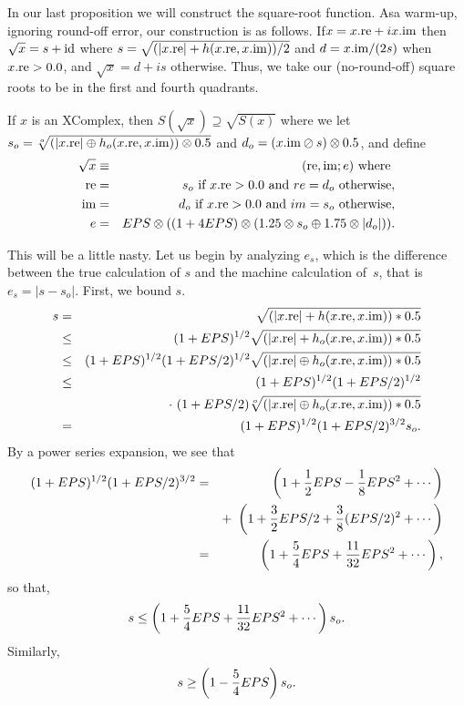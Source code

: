 In our last proposition we will construct the square-root function.  As\break a warm-up, ignoring round-off error, our
construction is as follows.  If\break $x = x.{\rm re} + i x.{\rm im}$ then $\sqrt{x} = s + {\rm i d}$ where $s=\sqrt{(|x.{\rm
re}| + h(x.{\rm re},x.{\rm im}))/2}$ and $d = x.{\rm im}/(2s)$ when $x.{\rm re} > 0.0$, and $\sqrt{x} = d + i s$ otherwise.  
Thus, we take our (no-round-off) square roots to be in the first and fourth quadrants.

If $x$ is an {\rm XComplex,} then $S(\sqrt{x}) \supseteq \sqrt{S(x)}$
where we
let $s_o = \root o \of {(|x.{\rm re}| \oplus h_o (x.{\rm re},x.{\rm im})) \otimes 0.5}$
 and $d_o = (x.{\rm im} \oslash s) \otimes 0.5${\rm ,} and define
\begin{eqnarray*}
 \sqrt{x} & \equiv &({\rm re},{\rm im};e) \hbox{ where }\\
 {\rm re} &=& s_o \hbox{ if $x.{\rm re} > 0.0$ and $re = d_o$ otherwise},\\
{\rm im}& =& d_o \hbox{ if $x.{\rm re} > 0.0$ and $im = s_o$ otherwise},
\\
e& =& EPS \otimes ((1 + 4 EPS) \otimes (1.25 \otimes s_o \oplus 1.75 \otimes |d_o|)).
\end{eqnarray*}
\endproclaim

This will be a little nasty.  Let us begin by analyzing $e_s$, which is the difference between the true calculation of $s$ and
the machine calculation of~$s$, that is $e_s = |s - s_o|.$   First, we bound $s.$
\begin{eqnarray*}
s &=& \sqrt{(|x.{\rm re}| + h(x.{\rm re},x.{\rm im})) * 0.5}\\
&\le& (1+EPS)^{1/2} \sqrt{(|x.{\rm re}| + h_o(x.{\rm re},x.{\rm im}))
* 0.5}\\
&\le& (1+EPS)^{1/2} (1+EPS/2)^{1/2}
\sqrt{(|x.{\rm re}| \oplus h_o(x.{\rm re},x.{\rm im})) * 0.5}\\
&\le& (1+EPS)^{1/2} (1+EPS/2)^{1/2}\\
&&\cdot\ (1+EPS/2)
\root o \of {(|x.{\rm re}| \oplus h_o(x.{\rm re},x.{\rm im})) * 0.5}\\
&=& (1+EPS)^{1/2} (1+EPS/2)^{3/2} s_o.
\end{eqnarray*}
By a power series expansion, we see that
\begin{eqnarray*}
(1+EPS)^{1/2} (1+EPS/2)^{3/2}&=&\left(1 + {1 \over 2} EPS - {1 \over 8} EPS^2 + \cdots\right)\\
&& +\
     \left(1 + {3 \over 2} EPS/2 + {3 \over 8} (EPS/2)^2 +\cdots\right)\\
&=&\left(1 + {5 \over 4} EPS + {11 \over 32} EPS^2 +\cdots\right),
\end{eqnarray*}
so that,
$$s \le \left(1 + {5 \over 4} EPS + {11 \over 32} EPS^2 + \cdots\right) s_o.$$
Similarly, 
$$s \ge \left(1 - {5 \over 4} EPS\right) s_o.$$

